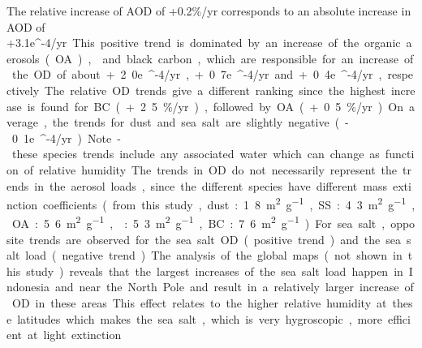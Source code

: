 \documentclass[acp, manuscript]{copernicus}
\begin{document}
The relative increase of AOD of +0.2\%/yr corresponds to an absolute increase in AOD of +3.1e\unit{^{-4}/yr}. This positive trend is dominated by an increase of the organic aerosols (OA),  and black carbon, which are responsible for an increase of the OD of about +2.0e\unit{^{-4}/yr}, +0.7e\unit{^{-4}/yr} and +0.4e\unit{^{-4}/yr}, respectively. The relative OD trends give a different ranking since the highest increase is found for BC (+2.5\%/yr), followed by OA (+0.5 \%/yr). On average, the trends for dust and sea salt are slightly negative (-0.1e\unit{^{-4}/yr}). Note - these species trends include any associated water which can change as function of relative humidity.

The trends in OD do not necessarily represent the trends in the aerosol loads, since the different species have different mass extinction coefficients (from this study, dust: 1.8 \unit{m^{2}.g^{-1}}, SS: 4.3 \unit{m^{2}.g^{-1}}, OA: 5.6 \unit{m^{2}.g^{-1}}, : 5.3 \unit{m^{2}.g^{-1}}, BC: 7.6 \unit{m^{2}.g^{-1}}). For sea salt, opposite trends are observed for the sea salt OD (positive trend) and the sea salt load (negative trend). The analysis of the global maps (not shown in this study) reveals that the largest increases of the sea salt load  happen in Indonesia and near the North Pole and result in a relatively larger increase of OD in these areas. This effect relates to the higher relative humidity at these latitudes which makes the sea salt, which is very hygroscopic, more efficient at light extinction.


\conclusions  %
\end{document}
